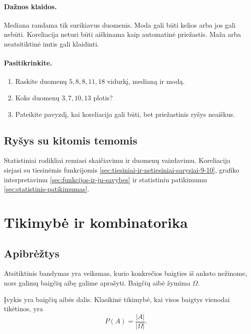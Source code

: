 \paragraph{Dažnos klaidos.}
Mediana randama tik surikiavus duomenis. Moda gali būti kelios arba jos gali nebūti. Koreliacija neturi būti aiškinama kaip automatinė priežastis. Maža arba neatsitiktinė imtis gali klaidinti.

\paragraph{Pasitikrinkite.}
\begin{enumerate}
\item Raskite duomenų $5,8,8,11,18$ vidurkį, medianą ir modą.
\item Koks duomenų $3,7,10,13$ plotis?
\item Pateikite pavyzdį, kai koreliacija gali būti, bet priežastinis ryšys neaiškus.
\end{enumerate}

\subsection{Ryšys su kitomis temomis}

Statistiniai rodikliai remiasi skaičiavimu ir duomenų vaizdavimu. Koreliacija siejasi su tiesinėmis funkcijomis \ref{sec:tiesiniai-ir-netiesiniai-sarysiai-9-10}, grafiko interpretavimu \ref{sec:funkcijos-ir-ju-savybes} ir statistiniu patikimumu \ref{sec:statistinis-patikimumas}.

\section{Tikimybė ir kombinatorika}\label{sec:tikimybe-ir-kombinatorika}

\subsection{Apibrėžtys}

\begin{apibreztis}
Atsitiktinis bandymas yra veiksmas, kurio konkrečios baigties iš anksto nežinome, nors galimų baigčių aibę galime aprašyti. Baigčių aibė žymima $\Omega$.
\end{apibreztis}

\begin{apibreztis}
Įvykis yra baigčių aibės dalis. Klasikinė tikimybė, kai visos baigtys vienodai tikėtinos, yra
\[
P(A)=\frac{|A|}{|\Omega|}.
\]
\end{apibreztis}

